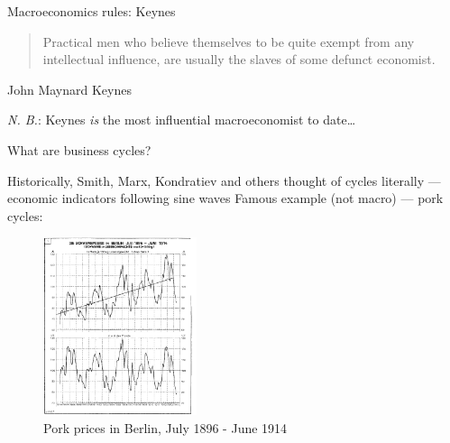 \documentclass{beamer}
\begin{document}
\begin{frame}{%
\protect\hypertarget{macroeconomics-rules-keynes}{%
Macroeconomics rules: Keynes}}

\begin{quote}
Practical men who believe themselves to be quite exempt from any
intellectual influence, are usually the slaves of some defunct
economist.
\end{quote}

\begin{flushright}
John Maynard Keynes
\end{flushright}

\vfill
\textit{N. B.}: Keynes \textit{is} the most influential macroeconomist to date\ldots
\end{frame}
\begin{frame}{What are business cycles?}

  Historically, Smith, Marx, Kondratiev and others thought of cycles literally --- economic indicators following sine waves
  \vfill
  Famous example (not macro) --- pork cycles:
  \vfill
\begin{center}
\begin{figure}[h!]
	\includegraphics[clip,width=0.4\textwidth]{FIGURES/1_PorkCycle_a}
\caption{Pork prices in Berlin, July 1896 - June 1914}
\end{figure}
\end{center}

\end{frame}
\end{document}
